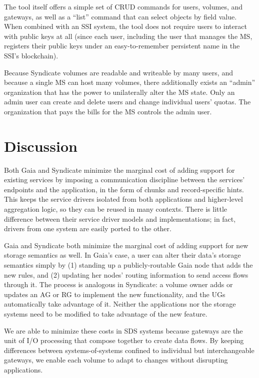 The tool itself offers a simple set of CRUD commands for users, volumes, and
gateways, as well as a ``list'' command that can select objects by field value.
When combined with an SSI system, the tool does not require users to interact with
public keys at all (since each user, including the user that manages the MS,
registers their public keys under an easy-to-remember persistent name in the
SSI's blockchain).

Because Syndicate volumes are readable and writeable by many users, and because
a single MS can host many volumes, there additionally exists an ``admin''
organization that has the power to unilaterally alter the MS state.  Only an
admin user can create and delete users and change individual users' quotas.
The organization that pays the bills for the MS controls the admin user.

\section{Discussion}

Both Gaia and Syndicate minimize the marginal cost of adding support for
existing services by imposing a communication discipline between the services'
endpoints and the application, in the form of chunks and record-specific hints.
This keeps the service drivers isolated from both applications and higher-level
aggregation logic, so they can be reused in many contexts.  There is little
difference between their service driver models and implementations; in fact,
drivers from one system are easily ported to the other.

Gaia and Syndicate both minimize the marginal cost of adding support for new
storage semantics as well.  In Gaia's case, a user can alter their data's
storage semantics simply by (1) standing up a publicly-routable Gaia node that adds the new
rules, and (2) updating her nodes' routing information to send access
flows through it.  The process is analogous in
Syndicate:  a volume owner adds or updates an AG or RG to implement the new
functionality, and the UGs automatically take advantage of it.
Neither the applications nor the
storage systems need to be modified to take advantage of the new
feature.

We are able to minimize these costs in SDS systems because gateways are the
unit of I/O processing that compose together to create data flows.  By keeping
differences between systems-of-systems confined to individual but
interchangeable gateways, we enable each volume to adapt to
changes without disrupting applications.

